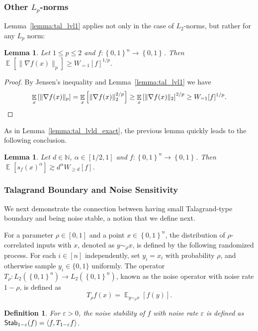 \documentclass[10pt]{article}
\newcommand{\set}[1]{{\left\{#1\right\}}}
\newcommand{\Expect}[2]{{\mathop{\mathbb E}_{#1}\left[#2\right]}}
\newcommand{\norm}[1]{\lVert #1\rVert}
\newcommand{\power}[1]{\set{0,1}^{#1}}
\newcommand{\inner}[2]{\langle #1,#2\rangle}
\newcommand{\eps}{\varepsilon}
\renewcommand{\gg}{\gtrsim}
\newtheorem{lemma}[thm]{Lemma}
\newtheorem{definition}[thm]{Definition}
\begin{document}
\subsubsection{Other $L_p$-norms}
Lemma~\ref{lemma:tal_lvl1} applies not only in the case of $L_2$-norms, but rather for any $L_p$ norm:
\begin{lemma}\label{lemma:tal_lvl1_L_p}
  Let $1\leq p\leq 2$ and $f\colon\power{n}\to\power{}$. Then
  $\Expect{}{\norm{\nabla f(x)}_p }\geq W_{=1}[f]^{1/p}$.
\end{lemma}
\begin{proof}
By Jensen's inequality and Lemma~\ref{lemma:tal_lvl1} we have
  \[
  \Expect{x}{\norm{\nabla f(x)}_p }
  =\Expect{x}{\norm{\nabla f(x)}_2^{2/p}}
  \geq \Expect{x}{\norm{\nabla f(x)}_2}^{2/p}
  \geq W_{=1}[f]^{1/p}.
  \qedhere
  \]
\end{proof}
As in Lemma~\ref{lemma:tal_lvld_exact}, the previous lemma quickly leads to the following conclusion.
\begin{lemma}\label{lemma:tal_lvld_above_alpha}
  Let $d\in\mathbb{N}$, $\alpha\in[1/2, 1]$ and $f\colon\power{n}\to\power{}$.
  Then $\Expect{}{s_f(x)^{\alpha}}\gg d^{\alpha} W_{\geq d}[f]$.
\end{lemma}
\setcounter{subsubsection}{1}\setcounter{thm}{9}
\subsubsection{Talagrand Boundary and Noise Sensitivity}
We next demonstrate the connection between having small Talagrand-type boundary and being noise stable, a notion that we define next.

For a parameter $\rho\in [0,1]$ and a point $x\in \power{n}$, the distribution of $\rho$-correlated inputs with $x$, denoted as $y\sim_{\rho} x$,
is defined by the following randomized process. For each $i\in[n]$ independently, set $y_i = x_i$ with probability $\rho$, and otherwise sample $y_i\in\{0,1\}$ uniformly.
The operator $T_{\rho}\colon L_2(\power{n}) \to L_2(\power{n})$, known as the noise operator with noise rate
$1-\rho$, is defined as
\[
T_{\rho} f(x) = \Expect{y\sim_{\rho} x}{f(y)}.
\]
\begin{definition}
  For $\eps>0$, the noise stability of $f$ with noise rate $\eps$ is defined as ${\sf Stab}_{1-\eps}(f) = \inner{f}{T_{1-\eps} f}$.
\end{definition}
\end{document}
